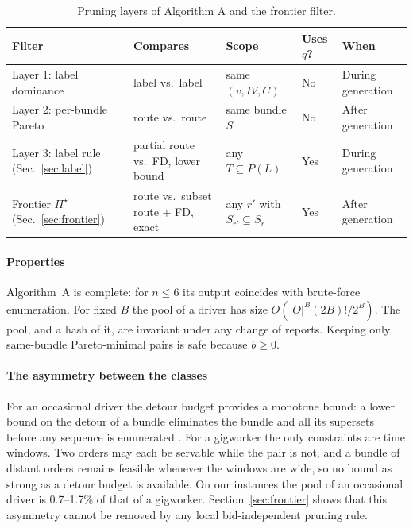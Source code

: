 \documentclass[review,12pt]{elsarticle}
\theoremstyle{definition}
\theoremstyle{remark}
\begin{document}
\begin{table}[t]
\centering
\caption{Pruning layers of Algorithm A and the frontier filter.}
\label{tab:layers}
\small
\begin{tabular}{p{3.3cm}p{3.1cm}p{3.4cm}p{1.6cm}p{2.6cm}}
\toprule
Filter & Compares & Scope & Uses $q$? & When\\
\midrule
Layer 1: label dominance & label vs.\ label & same $(v,IV,C)$ & No & During generation\\
Layer 2: per-bundle Pareto & route vs.\ route & same bundle $S$ & No & After generation\\
Layer 3: label rule (Sec.~\ref{sec:label}) & partial route vs.\ FD, lower bound & any $T\subseteq P(L)$ & Yes & During generation\\
Frontier $\Pi^\star$ (Sec.~\ref{sec:frontier}) & route vs.\ subset route $+$ FD, exact & any $r'$ with $S_{r'}\subseteq S_r$ & Yes & After generation\\
\bottomrule
\end{tabular}
\end{table}

\paragraph{Properties} Algorithm~A is complete: for $n\le 6$ its output
coincides with brute-force enumeration. For fixed $B$ the pool of a driver
has size $O(|O|^B(2B)!/2^B)$. The pool, and a hash of it, are invariant
under any change of reports. Keeping only same-bundle Pareto-minimal pairs
is safe because $b\ge 0$.

\paragraph{The asymmetry between the classes} For an occasional driver the
detour budget provides a monotone bound: a lower bound on the detour of a
bundle eliminates the bundle and all its supersets before any sequence is
enumerated \citep{li2026auction}. For a gigworker the only constraints are
time windows. Two orders may each be servable while the pair is not, and a
bundle of distant orders remains feasible whenever the windows are wide, so
no bound as strong as a detour budget is available. On our instances the pool of
an occasional driver is 0.7--1.7\% of that of a gigworker.
Section~\ref{sec:frontier} shows that this asymmetry cannot be removed by
any local bid-independent pruning rule.

\end{document}
